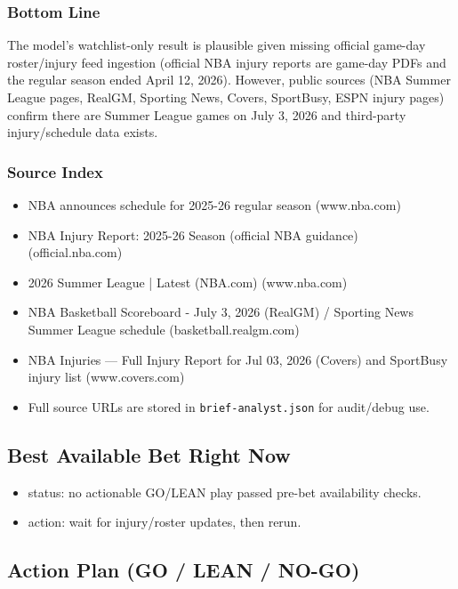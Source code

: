 \documentclass[10pt]{article}
\begin{document}
\subsubsection*{Bottom Line}

The model’s watchlist-only result is plausible given missing official game-day roster/injury feed ingestion (official NBA injury reports are game-day PDFs and the regular season ended April 12, 2026). However, public sources (NBA Summer League pages, RealGM, Sporting News, Covers, SportBusy, ESPN injury pages) confirm there are Summer League games on July 3, 2026 and third-party injury/schedule data exists.

\subsubsection*{Source Index}

\begin{itemize}
\item [S1] NBA announces schedule for 2025-26 regular season (www.nba.com)
\item [S2] NBA Injury Report: 2025-26 Season (official NBA guidance) (official.nba.com)
\item [S3] 2026 Summer League | Latest (NBA.com) (www.nba.com)
\item [S4] NBA Basketball Scoreboard - July 3, 2026 (RealGM) / Sporting News Summer League schedule (basketball.realgm.com)
\item [S5] NBA Injuries — Full Injury Report for Jul 03, 2026 (Covers) and SportBusy injury list (www.covers.com)
\item Full source URLs are stored in \texttt{brief-analyst.json} for audit/debug use.
\end{itemize}

\newpage

\subsection*{Best Available Bet Right Now}

\begin{itemize}
\item status: no actionable GO/LEAN play passed pre-bet availability checks.
\item action: wait for injury/roster updates, then rerun.
\end{itemize}

\newpage

\subsection*{Action Plan (GO / LEAN / NO-GO)}
\end{document}
